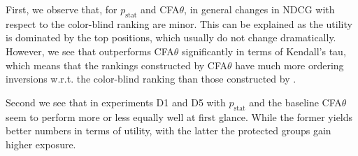 First, we observe that, for \algoFAIR $p_{\text{stat}}$ and CFA$\theta$, in general changes in NDCG with respect to the color-blind ranking are minor.
%
This can be explained as the utility is dominated by the top positions, which usually do not change dramatically.
%
However, we see that \algoFAIR outperforms CFA$\theta$ significantly in terms of Kendall's tau, which means that the rankings constructed by CFA$\theta$ have much more ordering inversions w.r.t. the color-blind ranking than those constructed by \algoFAIR. 

Second we see that in experiments D1 and D5 \algoFAIR with $p_{\text{stat}}$ and the baseline CFA$\theta$ seem to perform more or less equally well at first glance.
%
While the former yields better numbers in terms of utility, with the latter the protected groups gain higher exposure.
%
\begin{table}[t!]
	\caption{Experimental results, changes of individual utility loss respect to colorblind results.
		All measures are presented per group.
		Groups are in the same order as in Table~\ref{tbl:datasets}, and the first value is always for the non-protected group.
		Experiments that allow for meaningful comparisons are grouped together.
	}
	\vspace{-4mm}
	\label{tbl:results-part-two}
\end{table}
